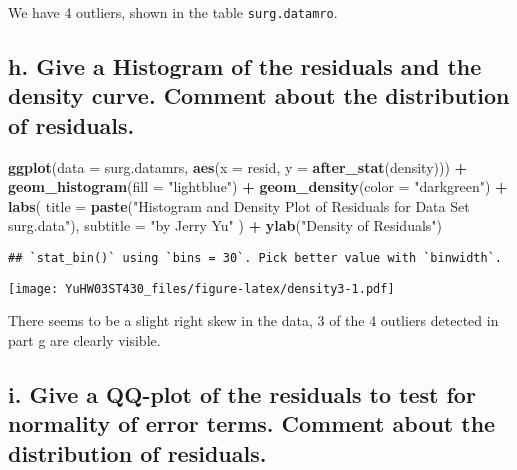 \documentclass[
]{article}
\newenvironment{Shaded}{\begin{snugshade}}{\end{snugshade}}
\newcommand{\AttributeTok}[1]{\textcolor[rgb]{0.13,0.29,0.53}{#1}}
\newcommand{\FunctionTok}[1]{\textcolor[rgb]{0.13,0.29,0.53}{\textbf{#1}}}
\newcommand{\NormalTok}[1]{#1}
\newcommand{\SpecialCharTok}[1]{\textcolor[rgb]{0.81,0.36,0.00}{\textbf{#1}}}
\newcommand{\StringTok}[1]{\textcolor[rgb]{0.31,0.60,0.02}{#1}}
\begin{document}
We have 4 outliers, shown in the table \texttt{surg.datamro}.

\hypertarget{h.-give-a-histogram-of-the-residuals-and-the-density-curve.-comment-about-the-distribution-of-residuals.}{%
\subsection{h. Give a Histogram of the residuals and the density curve.
Comment about the distribution of
residuals.}\label{h.-give-a-histogram-of-the-residuals-and-the-density-curve.-comment-about-the-distribution-of-residuals.}}

\begin{Shaded}
\begin{Highlighting}[]
\FunctionTok{ggplot}\NormalTok{(}\AttributeTok{data =}\NormalTok{ surg.datamrs, }\FunctionTok{aes}\NormalTok{(}\AttributeTok{x =}\NormalTok{ resid, }\AttributeTok{y =} \FunctionTok{after\_stat}\NormalTok{(density))) }\SpecialCharTok{+}
  \FunctionTok{geom\_histogram}\NormalTok{(}\AttributeTok{fill =} \StringTok{"lightblue"}\NormalTok{) }\SpecialCharTok{+}
  \FunctionTok{geom\_density}\NormalTok{(}\AttributeTok{color =} \StringTok{"darkgreen"}\NormalTok{) }\SpecialCharTok{+}
  \FunctionTok{labs}\NormalTok{(}
    \AttributeTok{title =} \FunctionTok{paste}\NormalTok{(}\StringTok{"Histogram and Density Plot of Residuals for Data Set surg.data"}\NormalTok{),}
    \AttributeTok{subtitle =} \StringTok{"by Jerry Yu"}
\NormalTok{  ) }\SpecialCharTok{+}
  \FunctionTok{ylab}\NormalTok{(}\StringTok{"Density of Residuals"}\NormalTok{)}
\end{Highlighting}
\end{Shaded}

\begin{verbatim}
## `stat_bin()` using `bins = 30`. Pick better value with `binwidth`.
\end{verbatim}

\texttt{[image: YuHW03ST430\_files/figure-latex/density3-1.pdf]}

There seems to be a slight right skew in the data, 3 of the 4 outliers
detected in part g are clearly visible.

\hypertarget{i.-give-a-qq-plot-of-the-residuals-to-test-for-normality-of-error-terms.-comment-about-the-distribution-of-residuals.}{%
\subsection{i. Give a QQ-plot of the residuals to test for normality of
error terms. Comment about the distribution of
residuals.}\label{i.-give-a-qq-plot-of-the-residuals-to-test-for-normality-of-error-terms.-comment-about-the-distribution-of-residuals.}}
\end{document}
